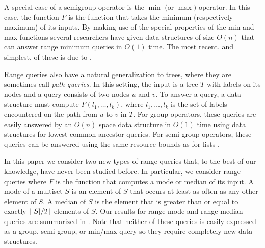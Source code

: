 \documentclass{njcarticle}
\begin{document}
A special case of a semigroup operator is the $\min$ (or $\max)$
operator.  In this case, the function $F$ is the function that takes
the minimum (respectively maximum) of its inputs. By making use of the
special properties of the min and max functions several researchers
 have given data structures of
size $O(n)$ that can answer range minimum queries in $O(1)$ time.  The
most recent, and simplest, of these is due to 
\cite{bf00}.

Range queries also have a natural generalization to trees, where they
are sometimes call \emph{path queries}.  In this setting, the input is
a tree $T$ with labels on its nodes and a query consists of two nodes
$u$ and $v$. To answer a query, a data structure must compute
$F(l_1,\ldots,l_k)$, where $l_1,\ldots,l_k$ is the set of labels
encountered on the path from $u$ to $v$ in $T$.  For group operators,
these queries are easily answered by an $O(n)$ space data structure in
$O(1)$ time using data structures for lowest-common-ancestor queries.
For semi-group operators, these queries can be answered using the same
resource bounds as for lists .

In this paper we consider two new types of range queries that, to the
best of our knowledge, have never been studied before.  In particular,
we consider range queries where $F$ is the function that computes a
mode or median of its input.  A mode of a multiset $S$ is an element
of $S$ that occurs at least as often as any other element of $S$.  A
median of $S$ is the element that is greater than or equal to exactly
$\left\lfloor |S|/2 \right\rfloor$ elements of $S$.  Our results for range mode and
range median queries are summarized in .  Note that
neither of these queries is easily expressed as a group, semi-group,
or min/max query so they require completely new data structures.
\end{document}
